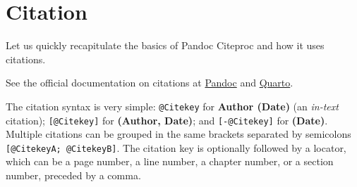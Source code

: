 \documentclass[
  12pt,
  a4paper,
  oneside,
  titlepage,
  toclink=all,
  toc=bibliography]{scrbook}
\theoremstyle{definition}
\theoremstyle{plain}
\theoremstyle{plain}
\theoremstyle{plain}
\theoremstyle{plain}
\theoremstyle{definition}
\theoremstyle{definition}
\theoremstyle{plain}
\theoremstyle{remark}
\begin{document}
\hypertarget{sec-scriv43}{%
\section{Citation}\label{sec-scriv43}}

\protect\hypertarget{scriv43}{}{}

Let us quickly recapitulate the basics of Pandoc Citeproc and how it
uses citations.

\begin{tcolorbox}[enhanced jigsaw, left=2mm, colframe=quarto-callout-note-color-frame, bottomtitle=1mm, colback=white, coltitle=black, title=\textcolor{quarto-callout-note-color}{\faInfo}\hspace{0.5em}{Official documentation}, toprule=.15mm, rightrule=.15mm, opacityback=0, breakable, toptitle=1mm, titlerule=0mm, colbacktitle=quarto-callout-note-color!10!white, arc=.35mm, bottomrule=.15mm, leftrule=.75mm, opacitybacktitle=0.6]

See the official documentation on citations at
\href{pandoc.org/MANUAL.html\#citations}{Pandoc} and
\href{quarto.org/docs/authoring/footnotes-and-citations.html\#sec-citations}{Quarto}.

\end{tcolorbox}


The citation syntax is very simple: \texttt{@Citekey} for \textbf{Author
(Date)} (an \emph{in-text} citation); \texttt{{[}@Citekey{]}} for
\textbf{(Author, Date)}; and \texttt{{[}-@Citekey{]}} for
\textbf{(Date)}. Multiple citations can be grouped in the same brackets
separated by semicolons \texttt{{[}@CitekeyA;\ @CitekeyB{]}}. The
citation key is optionally followed by a locator, which can be a page
number, a line number, a chapter number, or a section number, preceded
by a comma.
\end{document}
